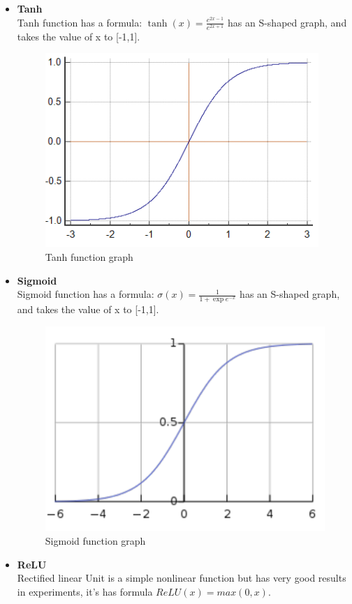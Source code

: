 \begin{itemize}
	\item \textbf{Tanh}\\
	Tanh function has a formula:  $\tanh(x) = \frac{e^{2x-1}}{e^{2x+1}}$ has an S-shaped graph, and takes the value of x to [-1,1].
	\begin{center}
		\begin{figure}[H]
			\centering
			\includegraphics[width=0.5\columnwidth]{images/chap2/tanh.png}
			\caption{Tanh function graph}
			\label{chap2:tanh}
		\end{figure}
	\end{center}
\vspace{-1cm}
	\item \textbf{Sigmoid}\\
	Sigmoid function has a formula: $ \sigma(x) = \frac{1}{1+\exp e^{-x}}$ has an S-shaped graph, and takes the value of x to [-1,1].
	\begin{center}
		\begin{figure}[H]
			\centering
			\includegraphics[width=0.5\columnwidth]{images/chap2/sigmoid.png}
			\caption{Sigmoid function graph}
			\label{chap2:sigmoid}
		\end{figure}
	\end{center}
\vspace{-1cm}
	\item \textbf{ReLU}\\
	Rectified linear Unit is a simple nonlinear function but has very good results in experiments, it's has formula $ReLU(x) = max (0,x)$.
		\begin{center}

\end{center}
\end{itemize}
